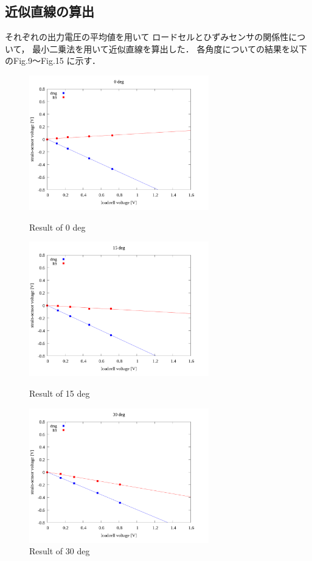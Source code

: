 \documentclass[twocolumn,a4j]{jsarticle}
\begin{document}
\subsection{近似直線の算出}
それぞれの出力電圧の平均値を用いて
ロードセルとひずみセンサの関係性について，
最小二乗法を用いて近似直線を算出した．
各角度についての結果を以下のFig.9～Fig.15 に示す．
\begin{figure}[htbp]
    \footnotesize
    \begin{center}
        \includegraphics[width=78mm]{../images/linear/0_linear.png}
        \caption{Result of 0 deg}
        \includegraphics[width=78mm]{../images/linear/15_linear.png}
        \caption{Result of 15 deg}
        \includegraphics[width=78mm]{../images/linear/30_linear.png}
        \caption{Result of 30 deg}
    \end{center}
\end{figure}
\end{document}
